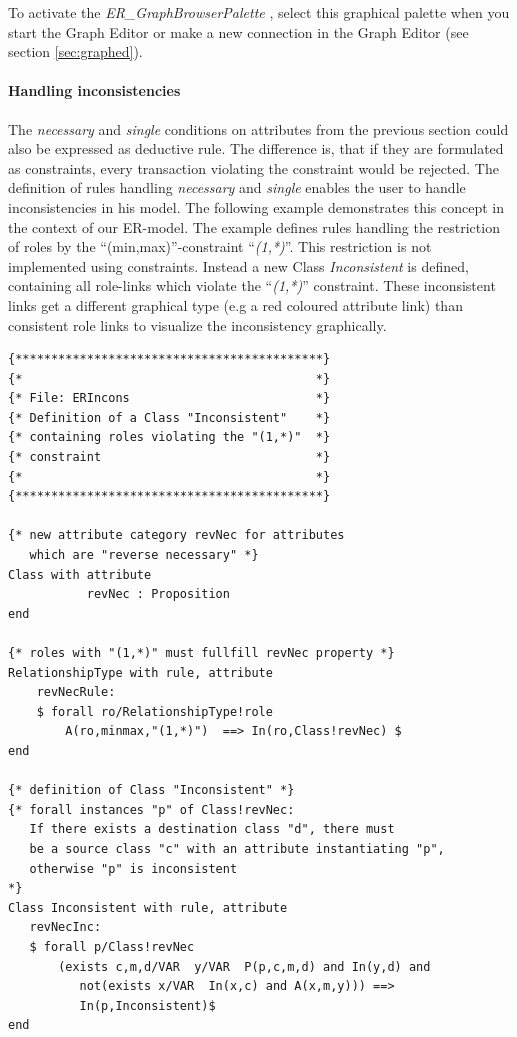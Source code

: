 To activate the {\em ER\_GraphBrowserPalette }, select this graphical
palette when you start the Graph Editor or make a new connection in
the Graph Editor (see section \ref{sec:graphed}).

\paragraph{Handling inconsistencies}
The {\em necessary} and {\em single} conditions on attributes from
the previous section could also be expressed as deductive rule.
The difference is, that if they are formulated as constraints,
every transaction violating the constraint would be rejected.
The definition of rules handling {\em necessary} and {\em single} enables
the user to handle inconsistencies in his model.
The following example demonstrates this concept in the context of
our ER-model. The example defines rules handling
the restriction of roles by the ``(min,max)''-constraint
``{\em (1,*)}''. This restriction is  not implemented
using constraints. Instead a new Class {\em Inconsistent} is
defined, containing all role-links which violate the
``{\em (1,*)}'' constraint. These inconsistent links get
a different graphical type (e.g a red coloured attribute link)
than consistent role links to visualize the inconsistency graphically.

{\small
\begin{verbatim}
{*******************************************}
{*                                         *}
{* File: ERIncons                          *}
{* Definition of a Class "Inconsistent"    *}
{* containing roles violating the "(1,*)"  *}
{* constraint                              *}
{*                                         *}
{*******************************************}

{* new attribute category revNec for attributes
   which are "reverse necessary" *}
Class with attribute
           revNec : Proposition
end

{* roles with "(1,*)" must fullfill revNec property *}
RelationshipType with rule, attribute
    revNecRule:
    $ forall ro/RelationshipType!role
        A(ro,minmax,"(1,*)")  ==> In(ro,Class!revNec) $
end

{* definition of Class "Inconsistent" *}
{* forall instances "p" of Class!revNec:
   If there exists a destination class "d", there must
   be a source class "c" with an attribute instantiating "p",
   otherwise "p" is inconsistent
*}
Class Inconsistent with rule, attribute
   revNecInc:
   $ forall p/Class!revNec
       (exists c,m,d/VAR  y/VAR  P(p,c,m,d) and In(y,d) and
          not(exists x/VAR  In(x,c) and A(x,m,y))) ==>
          In(p,Inconsistent)$
end
\end{verbatim}
}

